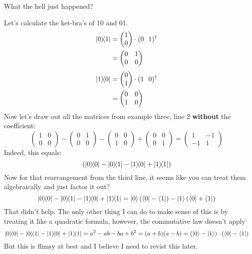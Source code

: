 \begin{mdframed}[hidealllines=true,backgroundcolor=black!60, fontcolor = white]
\begin{center}What the hell just happened?\end{center}
Let's calculate the ket-bra's of 10 and 01.
\begin{align*}
    \ketbra{0}{1} &= \begin{pmatrix}
    1 \\
    0
    \end{pmatrix} \cdot (0 \ \ 1)^\dagger\\
    &=\begin{pmatrix}
    0 & 1 \\
    0 & 0 
    \end{pmatrix}\\
\end{align*}
\begin{align*}
    \ketbra{1}{0} &= \begin{pmatrix}
    0 \\
    1
    \end{pmatrix} \cdot (1 \ \ 0)^\dagger\\
    &=\begin{pmatrix}
    0 & 0 \\
    1 & 0 
    \end{pmatrix}\\
\end{align*}
Now let's draw out all the matrices from example three, line 2 \textbf{without} the coefficient:
$$
\begin{pmatrix} 
1 & 0 \\ 
0 & 0
\end{pmatrix}
-
\begin{pmatrix}
0 & 1 \\
0 & 0 
\end{pmatrix}
-
\begin{pmatrix}
0 & 0 \\
1 & 0 
\end{pmatrix}
+
\begin{pmatrix} 
0 & 0 \\ 
0 & 1
\end{pmatrix}
=
\begin{pmatrix} 
1 & -1 \\ 
-1 & 1
\end{pmatrix}
$$
Indeed, this equals:
$$
(\ketbra{0}{0} - \ketbra{0}{1} -     \ketbra{1}{0} + \ketbra{1}{1})
$$
Now for that rearrangement from the third line, it seems like you can treat them algebraically and just factor it out?
$$
\ketbra{0}{0} - \ketbra{0}{1} -     \ketbra{1}{0} + \ketbra{1}{1} = \ket{0}(\bra{0} - \bra{1}) - \ket{1}(\bra{0}+\bra{1}) 
$$
That didn't help. The only other thing I can do to make sense of this is by treating it like a quadratic formula, however, the commutative law doesn't apply
$$
\ketbra{0}{0} - \ketbra{0}{1} -     \ketbra{1}{0} + \ketbra{1}{1} = a^2 - ab - ba + b^2 = (a+b)(a-b) = (\ket{0}-\ket{1})\cdot (\bra{0}-\bra{1})
$$
But this is flimsy at best and I believe I need to revist this later.
\end{mdframed}

